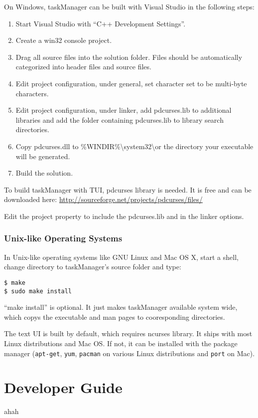 \documentclass[12pt, a4paper]{article}
\begin{document}
On Windows, taskManager can be built with Visual Studio in the following steps:
\begin{enumerate}
\item Start Visual Studio with ``C++ Development Settings''.
\item Create a win32 console project.
\item Drag all source files into the solution folder. Files should be automatically categorized into header files and source files.
\item Edit project configuration, under general, set character set to be multi-byte characters.
\item Edit project configuration, under linker, add pdcurses.lib to additional libraries and add the folder containing pdcurses.lib to library search directories.
\item Copy pdcurses.dll to \%WINDIR\%\textbackslash system32\textbackslash or the directory your executable will be generated.
\item Build the solution.
\end{enumerate}

To build taskManager with TUI, pdcurses library is needed.
It is free and can be downloaded here:
\url{http://sourceforge.net/projects/pdcurses/files/}

Edit the project property to include the pdcurses.lib and in the linker options.

\subsubsection{Unix-like Operating Systems}

In Unix-like operating systems like GNU Linux and Mac OS X, start a shell, change directory to taskManager's source folder and type:

\noindent \texttt{\$ make\\
  \$ sudo make install}

``make install'' is optional. It just makes taskManager available system wide, which copys the executable and man pages to cooresponding directories.

The text UI is built by default, which requires ncurses library.
It ships with most Linux distributions and Mac OS. If not, it can be installed with the package manager (\texttt{apt-get}, \texttt{yum}, \texttt{pacman} on various Linux distributions and \texttt{port} on Mac).

\section{Developer Guide}
ahah
\end{document}
